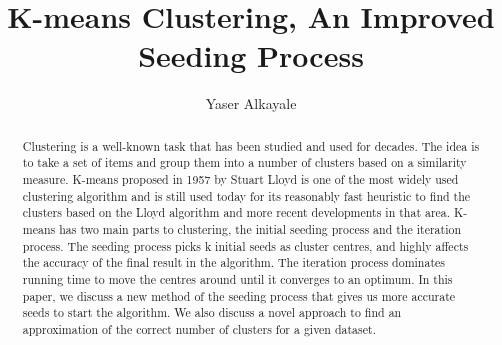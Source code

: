 \documentclass[12pt]{dalthesis}
\DeclarePairedDelimiter\abs{\lvert}{\rvert}%
\DeclarePairedDelimiter\norm{\lVert}{\rVert}%
\begin{document}
\makeatletter
\let\oldabs\abs
\def\abs{\@ifstar{\oldabs}{\oldabs*}}
%
\let\oldnorm\norm
\def\norm{\@ifstar{\oldnorm}{\oldnorm*}}
\makeatother
\newcommand*{\Value}{\frac{1}{2}x^2}%


\title{K-means Clustering, An Improved Seeding Process }
\author{Yaser Alkayale}

\bcshon  %





\nolistoftables


\frontmatter

\begin{abstract}
  \paragraph{}
  Clustering is a well-known task that has been studied and used for decades. The idea is to take a set of items and group them into a number of clusters based on a similarity measure. K-means proposed in 1957 by Stuart Lloyd is one of the most widely used clustering algorithm and is still used today for its reasonably fast heuristic to find the clusters based on the Lloyd algorithm and more recent developments in that area. K-means has two main parts to clustering, the initial seeding process and the iteration process. The seeding process picks k initial seeds as cluster centres, and highly affects the accuracy of the final result in the algorithm. The iteration process dominates running time to move the centres around until it converges to an optimum. In this paper, we discuss a new method of the seeding process that gives us more accurate seeds to start the algorithm. We also discuss a novel approach to find an approximation of the correct number of clusters for a given dataset.
\end{abstract}
\end{document}

